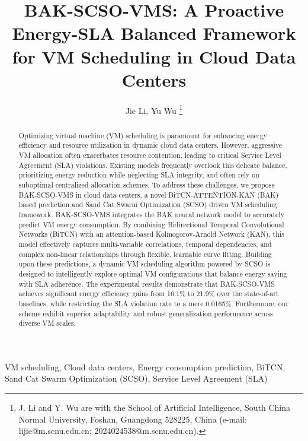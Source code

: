 \documentclass[conference]{{IEEEtran}}
\title{BAK-SCSO-VMS: A Proactive Energy-SLA Balanced Framework for VM Scheduling in Cloud Data Centers
}
\author{Jie Li, Yu Wu
\thanks{
        J. Li and Y. Wu are with the School of Artificial Intelligence, South China Normal University, Foshan, Guangdong 528225, China (e-mail: lijie@m.scnu.edu.cn; 2024024538@m.scnu.edu.cn).
    }
}
\begin{document}
\maketitle

\begin{abstract}
Optimizing virtual machine (VM) scheduling is paramount for enhancing energy efficiency and resource utilization in dynamic cloud data centers. However, aggressive VM allocation often exacerbates resource contention, leading to critical Service Level Agreement (SLA) violations. Existing models frequently overlook this delicate balance, prioritizing energy reduction while neglecting SLA integrity, and often rely on suboptimal centralized allocation schemes. To address these challenges, we propose BAK-SCSO-VMS in cloud data centers, a novel BiTCN-ATTENTION-KAN (BAK) based prediction and Sand Cat Swarm Optimization (SCSO) driven VM scheduling framework. BAK-SCSO-VMS integrates the BAK neural network model to accurately predict VM energy consumption. By combining Bidirectional Temporal Convolutional Networks (BiTCN) with an attention-based Kolmogorov-Arnold Network (KAN), this model effectively captures multi-variable correlations, temporal dependencies, and complex non-linear relationships through flexible, learnable curve fitting. Building upon these predictions, a dynamic VM scheduling algorithm powered by SCSO is designed to intelligently explore optimal VM configurations that balance energy saving with SLA adherence. The experimental results demonstrate that BAK-SCSO-VMS achieves significant energy efficiency gains from 16.1\% to 21.9\% over the state-of-art baselines, while restricting the SLA violation rate to a mere 0.0165\%. Furthermore, our scheme exhibit superior adaptability and robust generalization performance across diverse VM scales.

\end{abstract}

  \begin{IEEEkeywords}
    VM scheduling, Cloud data centers, Energy consumption prediction, BiTCN, Sand Cat Swarm Optimization (SCSO), Service Level Agreement (SLA)
  \end{IEEEkeywords}

%
\IEEEpeerreviewmaketitle
\end{document}
